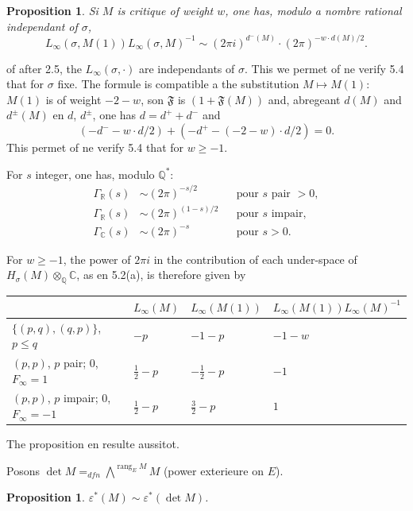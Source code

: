 \documentclass[12pt,a4paper]{article}
\theoremstyle{plain}
\newtheorem{proposition}[theorem]{Proposition}
\theoremstyle{definition}
\theoremstyle{remark}
\DeclareMathOperator{\rank}{rang}
\newcommand{\Q}{\mathbb{Q}}
\newcommand{\R}{\mathbb{R}}
\newcommand{\C}{\mathbb{C}}
\begin{document}
\begin{proposition}\label{prop:5.4}
Si $M$ is critique of weight $w$, one has, modulo a nombre rational independant of $\sigma$,
\[
L_\infty(\sigma, M(1)) L_\infty(\sigma, M)^{-1} \sim (2\pi i)^{d^-(M)} \cdot (2\pi)^{-w \cdot d(M)/2}.
\]
\end{proposition}

of after 2.5, the $L_\infty(\sigma, \cdot)$ are independants of $\sigma$. This we permet of ne
verify 5.4 that for $\sigma$ fixe. The formule is compatible a the substitution
$M \mapsto M(1)$: $M(1)$ is of weight $-2-w$, son $\mathfrak{F}$ is $(1+\mathfrak{F}(M))$ and, abregeant
$d(M)$ and $d^\pm(M)$ en $d$, $d^\pm$, one has $d = d^+ + d^-$ and
\[
(-d^- - w \cdot d/2) + (-d^+ - (-2-w) \cdot d/2) = 0.
\]
This permet of ne verify 5.4 that for $w \geq -1$.

For $s$ integer, one has, modulo $\Q^*$:
\begin{equation}\label{eq:5.4.1}
\begin{aligned}
\Gamma_\R(s) &\sim (2\pi)^{-s/2} &&\text{pour $s$ pair } > 0,\\
\Gamma_\R(s) &\sim (2\pi)^{(1-s)/2} &&\text{pour $s$ impair},\\
\Gamma_\C(s) &\sim (2\pi)^{-s} &&\text{pour $s > 0$.}
\end{aligned}
\end{equation}

For $w \geq -1$, the power of $2\pi i$ in the contribution of each under-space of
$H_\sigma(M) \otimes_\Q \C$, as en 5.2(a), is therefore given by

\begin{center}
\begin{tabular}{llll}
\toprule
& $L_\infty(M)$ & $L_\infty(M(1))$ & $L_\infty(M(1)) L_\infty(M)^{-1}$ \\
\midrule
$\{(p,q), (q,p)\}$, $p \leq q$ & $-p$ & $-1-p$ & $-1-w$ \\
$(p,p)$, $p$ pair; $0$, $F_\infty = 1$ & $\tfrac{1}{2}-p$ & $-\tfrac{1}{2}-p$ & $-1$ \\
$(p,p)$, $p$ impair; $0$, $F_\infty = -1$ & $\tfrac{1}{2}-p$ & $\tfrac{3}{2}-p$ & $1$ \\
\bottomrule
\end{tabular}
\end{center}
The proposition en resulte aussitot.

Posons $\det M =_{dfn} \bigwedge^{\rank_E M} M$ (power exterieure on $E$).

\begin{proposition}\label{prop:5.5}
$\varepsilon^*(M) \sim \varepsilon^*(\det M)$.
\end{proposition}
\end{document}
